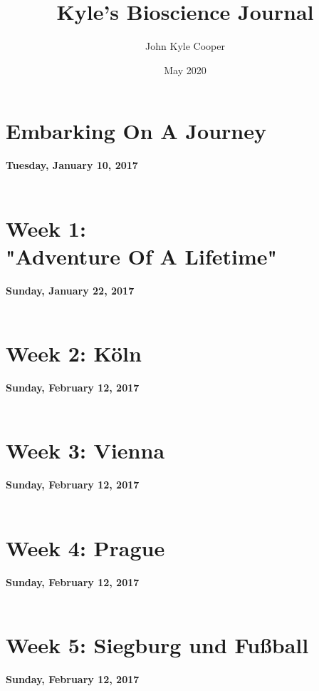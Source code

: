 \documentclass[oneside, 12pt]{book}
\title{Kyle's Bioscience Journal}
\author{John Kyle Cooper}
\date{May 2020}
\begin{document}
\frontmatter
\maketitle
\tableofcontents
{}

\mainmatter
\chapter{Embarking On A Journey}
\textbf{Tuesday, January 10, 2017}\\\\


\chapter[Week 1: "Adventure Of A Lifetime"]{Week 1:\\"Adventure Of A Lifetime"
}
\textbf{Sunday, January 22, 2017}\\\\


\chapter{Week 2: Köln}
\textbf{Sunday, February 12, 2017}\\\\


\chapter{Week 3: Vienna}
\textbf{Sunday, February 12, 2017}\\\\


\chapter{Week 4: Prague}
\textbf{Sunday, February 12, 2017}\\\\


\chapter{Week 5: Siegburg und Fußball}
\textbf{Sunday, February 12, 2017}\\\\

\end{document}
